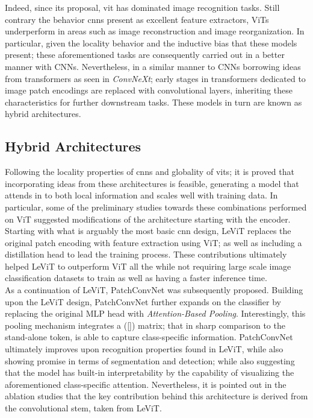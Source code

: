 \noindent Indeed, since its proposal, \gls{vit} has dominated image recognition tasks. Still 
contrary the behavior \glspl{cnn} present as excellent feature extractors, ViTs underperform in 
areas such as image reconstruction and image reorganization. In particular, given the locality 
behavior and the inductive bias that these models present; these aforementioned tasks are 
consequently carried out in a better manner with CNNs. Nevertheless, in a similar manner to 
CNNs borrowing ideas from transformers as seen in \emph{ConvNeXt}; early stages in transformers 
dedicated to image patch encodings are replaced with convolutional layers, inheriting these 
characteristics for further downstream tasks. These models in turn are known as hybrid 
architectures.
\subsection{Hybrid Architectures}
\label{rel:sub_hybrid}
Following the locality properties of \glspl{cnn} and globality of \glspl{vit}; it is proved 
that incorporating ideas from these architectures is feasible, generating a model that attends in 
to both local information and scales well with training data. In particular, some of the
preliminary studies towards these combinations performed on ViT suggested modifications of the 
architecture starting with the encoder. Starting with what is arguably the most basic \gls{cnn} 
design, LeViT \autocite{graham2021levit} replaces the original patch encoding with feature 
extraction using ViT; as well as including a distillation head to lead the training process. 
These contributions ultimately helped LeViT to outperform ViT all the while not requiring large 
scale image classification datasets to train as well as having a faster inference time.\\

\noindent As a continuation of LeViT, PatchConvNet \autocite{touvron2021augmenting} was subsequently 
proposed. Building upon the LeViT design, PatchConvNet further expands on the classifier by 
replacing the original MLP head with \emph{Attention-Based Pooling}. Interestingly, this 
pooling mechanism integrates a ([]) matrix; that in sharp comparison to the stand-alone 
token, is able to capture class-specific information. PatchConvNet ultimately improves upon 
recognition properties found in LeViT, while also showing promise in terms of segmentation and 
detection; while also suggesting that the model has built-in interpretability by the capability of 
visualizing the aforementioned class-specific attention. Nevertheless, it is pointed out in the 
ablation studies that the key contribution behind this architecture is derived from the 
convolutional stem, taken from LeViT.\\ 

